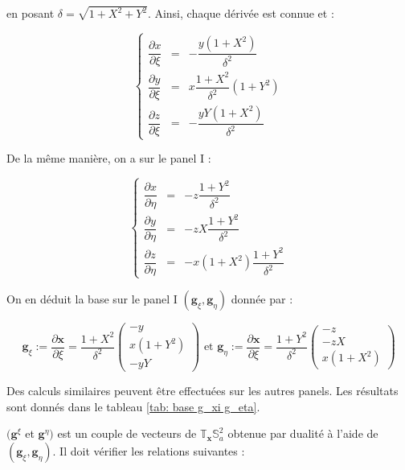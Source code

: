 en posant $\delta = \sqrt{1+X^2+Y^2}$. Ainsi, chaque dérivée est connue et :

\begin{equation}
\left\lbrace
\begin{array}{rcl}
\dfrac{\partial x}{\partial \xi} & = & -\dfrac{y(1+X^2)}{\delta^2}\\
\dfrac{\partial y}{\partial \xi} & = & x \dfrac{1+X^2}{\delta^2} (1+Y^2)\\
\dfrac{\partial z}{\partial \xi} & = & - \dfrac{yY(1+X^2)}{\delta^2}
\end{array}
\right.
\end{equation}

De la même manière, on a sur le panel I :

\begin{equation}
\left\lbrace
\begin{array}{rcl}
\dfrac{\partial x}{\partial \eta} & = & - z\dfrac{1+Y^2}{\delta^2}\\
\dfrac{\partial y}{\partial \eta} & = & - zX\dfrac{1+Y^2}{\delta^2}\\
\dfrac{\partial z}{\partial \eta} & = & - x(1+X^2) \dfrac{1+Y^2}{\delta^2}
\end{array}
\right.
\end{equation}

On en déduit la base sur le panel I $\left( \mathbf{g}_{\xi}, \mathbf{g}_{\eta} \right)$ donnée par :

\begin{equation}
\mathbf{g}_{\xi} := \dfrac{\partial \mathbf{x}}{\partial \xi}= \dfrac{1+X^2}{\delta^2} \begin{pmatrix}
-y \\ x(1+Y^2) \\ -yY
\end{pmatrix} \text{ et } \mathbf{g}_{\eta} := \dfrac{\partial \mathbf{x}}{\partial \xi}= \dfrac{1+Y^2}{\delta^2} \begin{pmatrix}
-z \\ -zX \\ x(1+X^2)
\end{pmatrix}
\label{eq: base locale I}
\end{equation}

Des calculs similaires peuvent être effectuées sur les autres panels. Les résultats sont donnés dans le tableau \ref{tab: base g_xi g_eta}.

$(\mathbf{g}^{\xi}$ et $\mathbf{g}^{\eta})$ est un couple de vecteurs de $\mathbb{T}_{\mathbf{x}}\mathbb{S}_a^2$ obtenue par dualité à l'aide de $(\mathbf{g}_{\xi}, \mathbf{g}_{\eta})$. Il doit vérifier les relations suivantes :

